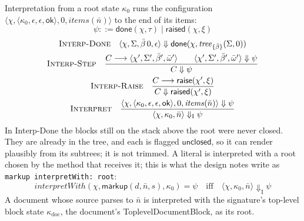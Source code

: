 \documentclass[11pt]{article}
\numberwithin{equation}{section}
\newcommand{\kw}[1]{\ensuremath{\mathsf{#1}}}
\newcommand{\rulelabel}[1]{\textsc{#1}}
\begin{document}
Interpretation from a root state $\kappa_0$ runs the configuration
$\langle \chi, \langle \kappa_0, \epsilon, \epsilon, \kw{ok} \rangle, 0,
\mathit{items}(\bar n) \rangle$ to the end of its items:
\begin{equation}\label{eq:interp-results}
\psi ::= \kw{done}(\chi, \tau) \mid \kw{raised}(\chi, \xi)
\end{equation}
\begin{gather}
\label{eq:interp-done}
\rulelabel{Interp-Done}\quad
\langle \chi, \Sigma, \bar\beta\,0, \epsilon \rangle \Downarrow
  \kw{done}(\chi, \mathit{tree}_{\{\bar\beta\}}(\Sigma, 0))
\\
\label{eq:interp-step}
\rulelabel{Interp-Step}\quad
\frac{C \longrightarrow \langle \chi', \Sigma', \bar\beta', \bar\omega' \rangle
      \qquad \langle \chi', \Sigma', \bar\beta', \bar\omega' \rangle \Downarrow \psi}
     {C \Downarrow \psi}
\\
\label{eq:interp-raise}
\rulelabel{Interp-Raise}\quad
\frac{C \longrightarrow \kw{raise}(\chi', \xi)}
     {C \Downarrow \kw{raised}(\chi', \xi)}
\\
\label{eq:interpret}
\rulelabel{Interpret}\quad
\frac{\langle \chi, \langle \kappa_0, \epsilon, \epsilon, \kw{ok} \rangle, 0,
        \mathit{items}(\bar n) \rangle \Downarrow \psi}
     {\langle \chi, \kappa_0, \bar n \rangle \Downarrow_{\mathrm{I}} \psi}
\end{gather}
In Interp-Done the blocks still on the stack above the root were never
closed.  They are already in the tree, and each is flagged
$\kw{unclosed}$, so it can render plausibly from its subtrees; it is not
trimmed.  A literal is interpreted with a root chosen by the method that
receives it; this is what the design notes write as
\texttt{markup interpretWith: root}:
\begin{equation}\label{eq:interpret-with}
\mathit{interpretWith}(\chi, \kw{markup}(d, \bar n, s), \kappa_0) = \psi
\quad\text{iff}\quad
\langle \chi, \kappa_0, \bar n \rangle \Downarrow_{\mathrm{I}} \psi
\end{equation}
A document whose source parses to $\bar n$ is interpreted with the
signature's top-level block state $\kappa_{\mathrm{doc}}$, the
document's ToplevelDocumentBlock, as its root.
\end{document}
